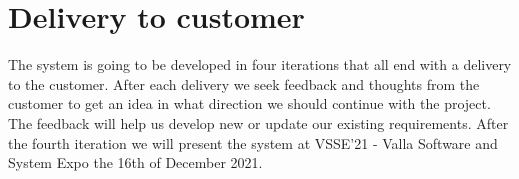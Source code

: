 \section{Delivery to customer}
The system is going to be developed in four iterations that all end with a delivery to the customer. After each delivery we seek feedback and thoughts from the customer to get an idea in what direction we should continue with the project. The feedback will help us develop new or update our existing requirements. After the fourth iteration we will present the system at VSSE'21 - Valla Software and System Expo the 16th of December 2021.  